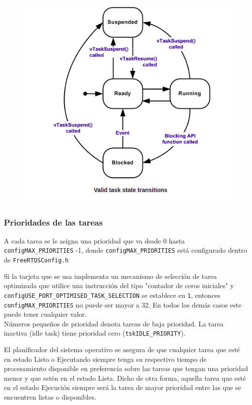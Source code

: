     
    \begin{figure}[H]
        \centering
        \includegraphics[scale=0.7]{RTOS/f11.PNG}
    \end{figure}
    
    
    \subsubsection{Prioridades de las tareas}
    
    A cada tarea se le asigna una prioridad que va desde 0 hasta \texttt{configMAX\_PRIORITIES} -1, donde \texttt{configMAX\_PRIORITIES} está configurado dentro de \texttt{FreeRTOSConfig.h}
    
    Si la tarjeta que se usa implementa un mecanismo de selección de tarea optimizada que utilice una instrucción del tipo "contador de ceros iniciales" y \texttt{configUSE\_PORT\_OPTIMISED\_TASK\_SELECTION} se establece en \texttt{1}, entonces \texttt{configMAX\_PRIORITIES} no puede ser mayor a 32. En todos los demás casos este puede tener cualquier valor.\\
    
    Números pequeños de prioridad denota tareas de baja prioridad. La tarea inactiva (idle task) tiene prioridad cero (\texttt{tskIDLE\_PRIORITY}). 
    
    El planificador del sistema operativo se asegura de que cualquier tarea que esté en estado Listo o Ejecutando siempre tenga su respectivo tiempo de procesamiento disponible en preferencia sobre las tareas que tengan una prioridad menor y que estén en el estado Lista. Dicho de otra forma, aquella tarea que esté en el estado Ejecución siempre será la tarea de mayor prioridad entre las que se encuentren listas o disponibles. 
    

